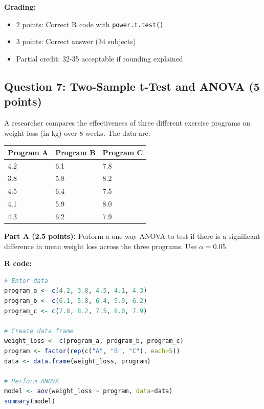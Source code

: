 \documentclass[11pt]{article}
\begin{document}
\textbf{Grading:}
\begin{itemize}
\item 2 points: Correct R code with \texttt{power.t.test()}
\item 3 points: Correct answer (34 subjects)
\item Partial credit: 32-35 acceptable if rounding explained
\end{itemize}

\vspace{1cm}

\subsection*{Question 7: Two-Sample t-Test and ANOVA (5 points)}

A researcher compares the effectiveness of three different exercise programs on weight loss (in kg) over 8 weeks. The data are:

\vspace{0.3cm}

\begin{center}
\begin{tabular}{lll}
\toprule
Program A & Program B & Program C \\
\midrule
4.2 & 6.1 & 7.8 \\
3.8 & 5.8 & 8.2 \\
4.5 & 6.4 & 7.5 \\
4.1 & 5.9 & 8.0 \\
4.3 & 6.2 & 7.9 \\
\bottomrule
\end{tabular}
\end{center}

\vspace{0.3cm}

\textbf{Part A (2.5 points):} Perform a one-way ANOVA to test if there is a significant difference in mean weight loss across the three programs. Use $\alpha = 0.05$.

\vspace{0.3cm}

\textbf{R code:}

\begin{lstlisting}[language=R,basicstyle=\small\ttfamily,frame=single]
# Enter data
program_a <- c(4.2, 3.8, 4.5, 4.1, 4.3)
program_b <- c(6.1, 5.8, 6.4, 5.9, 6.2)
program_c <- c(7.8, 8.2, 7.5, 8.0, 7.9)

# Create data frame
weight_loss <- c(program_a, program_b, program_c)
program <- factor(rep(c("A", "B", "C"), each=5))
data <- data.frame(weight_loss, program)

# Perform ANOVA
model <- aov(weight_loss ~ program, data=data)
summary(model)
\end{lstlisting}
\end{document}
